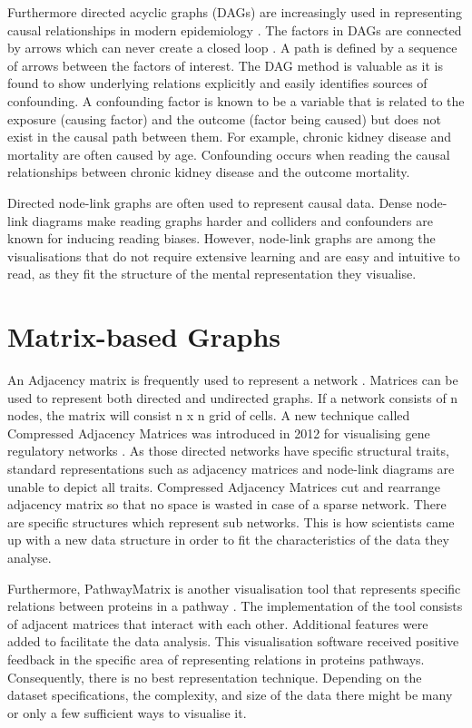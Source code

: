 \documentclass{l4proj}
\begin{document}
Furthermore directed acyclic graphs (DAGs) are increasingly used in representing causal relationships in modern epidemiology \cite{suttorp2015graphical}. The factors in DAGs are connected by arrows which can never create a closed loop \cite{greenland1999causal}. A path is defined by a sequence of arrows between the factors of interest. The DAG method is valuable as it is found to show underlying relations explicitly and easily identifies sources of confounding. A confounding factor is known to be a variable that is related to  the exposure (causing factor) and the outcome (factor being caused) but does not exist in the causal path between them. For example, chronic kidney disease and mortality are often caused by age. Confounding occurs when reading the causal relationships between chronic kidney disease and the outcome mortality. 

Directed node-link graphs are often used to represent causal data. Dense node-link diagrams make reading graphs harder and colliders and confounders are known for inducing reading biases. However, node-link graphs are among the visualisations that do not require extensive learning and are easy and intuitive to read, as they fit the structure of the mental representation they visualise\cite{netzel2014comparative}.

\section{Matrix-based Graphs}

An Adjacency matrix is frequently used to represent a network \cite{longabaugh2012combing}. Matrices can be used to represent both directed and undirected graphs. If a network consists of n nodes, the matrix will consist n x n grid of cells. A new technique called Compressed Adjacency Matrices was introduced in 2012 for visualising gene regulatory networks \cite{dinkla2012compressed}. As those directed networks have specific structural traits, standard representations such as adjacency matrices and node-link diagrams are unable to depict all traits. Compressed Adjacency Matrices cut and rearrange adjacency matrix so that no space is wasted in case of a sparse network. There are specific structures which represent sub networks. This is how scientists came up with a new data structure in order to fit the characteristics of the data they analyse.

Furthermore, PathwayMatrix is another visualisation tool that represents specific relations between proteins in a pathway \cite{dang2015pathwaymatrix}. The implementation of the tool consists of adjacent matrices that interact with each other. Additional features were added to facilitate the data analysis. This visualisation software received positive feedback in the specific area of representing relations in proteins pathways. Consequently, there is no best representation technique. Depending on the dataset specifications, the complexity, and size of the data there might be many or only a few sufficient ways to visualise it.       
\end{document}
